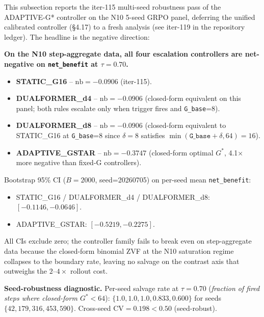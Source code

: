 \label{sec:p7-adaptive-gstar-n10-multiseed}

This subsection reports the iter-115 multi-seed robustness pass of the
ADAPTIVE-G* controller on the N10 5-seed GRPO panel, deferring the
unified calibrated controller (§4.17) to a fresh analysis
(see iter-119 in the repository ledger). The headline is the negative direction:

\textbf{On the N10 step-aggregate data, all four escalation controllers
  are net-negative on \texttt{net\_benefit} at $\tau=0.70$.}

\begin{itemize}
\item \textbf{STATIC\_G16} -- $\mathrm{nb}=-0.0906$ (iter-115).
\item \textbf{DUALFORMER\_d4} -- $\mathrm{nb}=-0.0906$ (closed-form
  equivalent on this panel; both rules escalate only when trigger fires
  and \texttt{G\_base}=8).
\item \textbf{DUALFORMER\_d8} -- $\mathrm{nb}=-0.0906$ (closed-form
  equivalent to STATIC\_G16 at \texttt{G\_base}=8 since $\delta=8$
  satisfies $\min(\texttt{G\_base}+\delta, 64)=16$).
\item \textbf{ADAPTIVE\_GSTAR} -- $\mathrm{nb}=-0.3747$ (closed-form
  optimal $G^*$, 4.1$\times$ more negative than fixed-G controllers).
\end{itemize}

Bootstrap 95\% CI ($B=2000$, seed=20260705) on per-seed mean
\texttt{net\_benefit}:
\begin{itemize}
\item STATIC\_G16 / DUALFORMER\_d4 / DUALFORMER\_d8: $[-0.1146,-0.0646]$.
\item ADAPTIVE\_GSTAR: $[-0.5219,-0.2275]$.
\end{itemize}
All CIs exclude zero; the controller family fails to break even on
step-aggregate data because the closed-form binomial ZVF at the N10
saturation regime collapses to the boundary rate, leaving no salvage
on the contrast axis that outweighs the $2$--$4\times$ rollout cost.

\textbf{Seed-robustness diagnostic.} Per-seed salvage rate at
$\tau=0.70$
(\textit{fraction of fired steps where closed-form $G^*<64$}):
$\{1.0, 1.0, 1.0, 0.833, 0.600\}$ for seeds
$\{42, 179, 316, 453, 590\}$. Cross-seed CV$=0.198<0.50$ (seed-robust).

